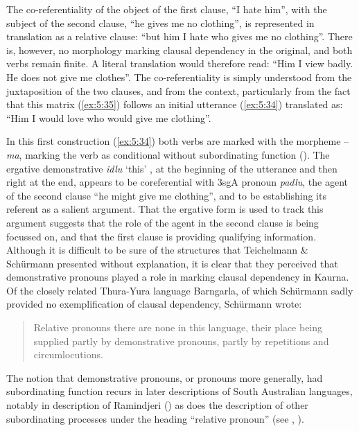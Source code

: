 The co-referentiality of the object of the first clause, “I hate him”, with the subject of the second clause, “he gives me no clothing”, is represented in translation as a relative clause: “but him I hate who gives me no clothing”. There is, however, no morphology marking clausal dependency in the original, and both verbs remain finite. A literal translation would therefore read: “Him I view badly. He does not give me clothes”. The co-referentiality is simply understood from the juxtaposition of the two clauses, and from the context, particularly from the fact that this matrix (\ref{ex:5:35}) follows an initial utterance (\ref{ex:5:34}) translated as: “Him I would love who would give me clothing”.

In this first construction (\ref{ex:5:34}) both verbs are marked with the morpheme –\textit{ma}, marking the verb as conditional without subordinating function (). The ergative demonstrative \textit{idlu} `this' \citep[9]{teichelmann_outlines_1840}, at the beginning of the utterance and then right at the end, appears to be coreferential with 3sgA pronoun \textit{padlu}, the agent of the second clause “he might give me clothing”, and to be establishing its referent as a salient argument. That the ergative form is used to track this argument suggests that the role of the agent in the second clause is being focussed on, and that the first clause is providing qualifying information.
Although it is difficult to be sure of the structures that Teichelmann \& Schürmann presented without explanation, it is clear that they perceived that demonstrative pronouns played a role in marking clausal dependency in Kaurna. Of the closely related Thura-Yura language Barngarla, of which Schürmann sadly provided no exemplification of clausal dependency, Schürmann wrote: 
\begin{quote}
    Relative pronouns there are none in this language, their place being supplied partly by demonstrative pronouns, partly by repetitions and circumlocutions. \citep[10]{schurmann_letter_1844}
\end{quote}


The notion that demonstrative pronouns, or pronouns more generally, had subordinating function recurs in later descriptions of South Australian languages, notably in  description of Ramindjeri () as does the description of other subordinating processes under the heading “relative pronoun” (see , ).

